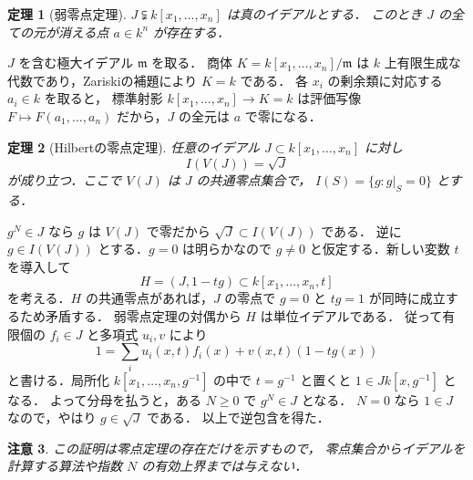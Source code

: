 \documentclass[a5paper,10pt,onecolumn]{jsarticle}
\makeatletter
\theoremstyle{mathnotetheorem}
\newtheorem{theorem}{定理}[section]
\newtheorem{remark}[theorem]{注意}
\renewcommand{\proofname}{証明}
\renewenvironment{proof}[1][\proofname]{%
  \par\pushQED{\qed}\normalfont\topsep4\p@\@plus2\p@\relax
  \trivlist\item[\hskip\labelsep\bfseries #1]\ignorespaces
}{\popQED\endtrivlist\@endpefalse}
\makeatother
\begin{document}
\begin{theorem}[弱零点定理]
$J\subsetneqq k[x_1,\ldots,x_n]$ は真のイデアルとする．
このとき $J$ の全ての元が消える点 $a\in k^n$ が存在する．
\end{theorem}
\begin{proof}
$J$ を含む極大イデアル $\mathfrak m$ を取る．
商体 $K=k[x_1,\ldots,x_n]/\mathfrak m$ は
$k$ 上有限生成な代数であり，Zariskiの補題により $K=k$ である．
各 $x_i$ の剰余類に対応する $a_i\in k$ を取ると，
標準射影 $k[x_1,\ldots,x_n]\to K=k$ は評価写像
$F\mapsto F(a_1,\ldots,a_n)$ だから，$J$ の全元は $a$ で零になる．
\end{proof}
\begin{theorem}[Hilbertの零点定理]
任意のイデアル $J\subset k[x_1,\ldots,x_n]$ に対し
\[
 I(V(J))=\sqrt J
\]
が成り立つ．ここで $V(J)$ は $J$ の共通零点集合で，
$I(S)=\{g:g|_S=0\}$ とする．
\end{theorem}
\begin{proof}
$g^N\in J$ なら $g$ は $V(J)$ で零だから
$\sqrt J\subset I(V(J))$ である．
逆に $g\in I(V(J))$ とする．$g=0$ は明らかなので
$g\ne0$ と仮定する．新しい変数 $t$ を導入して
\[
 H=(J,1-tg)\subset k[x_1,\ldots,x_n,t]
\]
を考える．$H$ の共通零点があれば，$J$ の零点で $g=0$ と
$tg=1$ が同時に成立するため矛盾する．
弱零点定理の対偶から $H$ は単位イデアルである．
従って有限個の $f_i\in J$ と多項式 $u_i,v$ により
\[
 1=\sum_i u_i(x,t)f_i(x)+v(x,t)(1-tg(x))
\]
と書ける．局所化 $k[x_1,\ldots,x_n,g^{-1}]$ の中で
$t=g^{-1}$ と置くと $1\in Jk[x,g^{-1}]$ となる．
よって分母を払うと，ある $N\ge0$ で $g^N\in J$ となる．
$N=0$ なら $1\in J$ なので，やはり $g\in\sqrt J$ である．
以上で逆包含を得た．
\end{proof}
\begin{remark}
この証明は零点定理の存在だけを示すもので，
零点集合からイデアルを計算する算法や指数 $N$ の有効上界までは与えない．
\end{remark}
\end{document}
